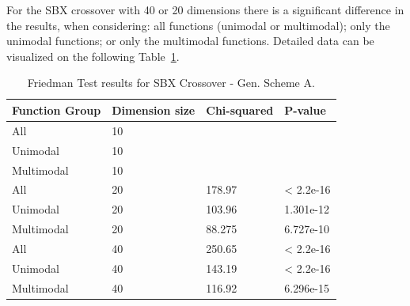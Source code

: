 For the SBX crossover with 40 or 20 dimensions there is a significant difference in the results, when considering: all functions (unimodal or multimodal); only the unimodal functions; or only the multimodal functions. Detailed data can be visualized on the following Table~\ref{Friedman_test_sbx}. 


\begin{table}[h]
	\centering
	\begin{tabular}{|l|l|l|l|}
		\hline
		\textbf{Function Group} & \textbf{Dimension size}      & \textbf{Chi-squared}        & \textbf{P-value}                     \\ \hline
		\multicolumn{1}{|l|}{All} & \multicolumn{1}{|l|}{10} & \multicolumn{1}{l|}{ } & \multicolumn{1}{l|}{ } \\ \hline
		\multicolumn{1}{|l|}{Unimodal} & \multicolumn{1}{|l|}{10} & \multicolumn{1}{l|}{ } & \multicolumn{1}{l|}{ } \\ \hline
		\multicolumn{1}{|l|}{Multimodal} & \multicolumn{1}{|l|}{10} & \multicolumn{1}{l|}{ } & \multicolumn{1}{l|}{ }  \\ \hline
		\hline
		\multicolumn{1}{|l|}{All} & \multicolumn{1}{|l|}{20} & \multicolumn{1}{l|}{178.97} & \multicolumn{1}{l|}{< 2.2e-16} \\ \hline
		\multicolumn{1}{|l|}{Unimodal} & \multicolumn{1}{|l|}{20} & \multicolumn{1}{l|}{103.96} & \multicolumn{1}{l|}{1.301e-12} \\ \hline
		\multicolumn{1}{|l|}{Multimodal} & \multicolumn{1}{|l|}{20} & \multicolumn{1}{l|}{88.275} & \multicolumn{1}{l|}{6.727e-10}  \\ \hline
		\hline
		\multicolumn{1}{|l|}{All} & \multicolumn{1}{|l|}{40} & \multicolumn{1}{l|}{250.65} & \multicolumn{1}{l|}{< 2.2e-16} 						\\ \hline
		\multicolumn{1}{|l|}{Unimodal} & \multicolumn{1}{|l|}{40} & \multicolumn{1}{l|}{143.19} & \multicolumn{1}{l|}{< 2.2e-16} \\ \hline
		\multicolumn{1}{|l|}{Multimodal} & \multicolumn{1}{|l|}{40} & \multicolumn{1}{l|}{116.92} & \multicolumn{1}{l|}{6.296e-15}  \\ \hline
	\end{tabular}
	\caption{Friedman Test results for SBX Crossover - Gen. Scheme A.}
	\label{Friedman_test_sbx}	
\end{table}

